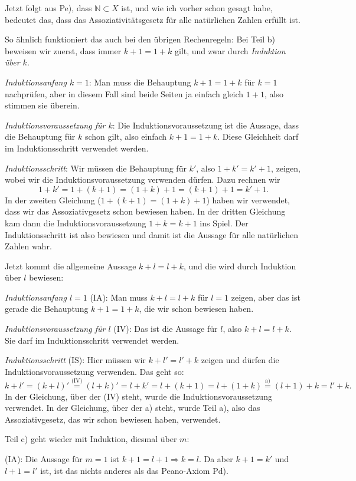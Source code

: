 \documentclass{zusammenfassung}
\begin{document}
Jetzt folgt aus Pe), dass $\mathbb N\subset X$ ist, und wie ich vorher schon gesagt habe, bedeutet das, dass das
Assoziativitätsgesetz für alle natürlichen Zahlen erfüllt ist.

So ähnlich funktioniert das auch bei den übrigen Rechenregeln: Bei Teil b) beweisen wir zuerst, dass immer $k+1=1+k$ gilt, und
zwar durch \emph{Induktion über $k$}.

\emph{Induktionsanfang $k=1$}: Man muss die Behauptung $k+1=1+k$ für $k=1$ nachprüfen, aber in diesem Fall sind beide Seiten ja
einfach gleich $1+1$, also stimmen sie überein.

\emph{Induktionsvoraussetzung für $k$}: Die Induktionsvoraussetzung ist die Aussage, dass die Behauptung für $k$ schon gilt, also
einfach $k+1=1+k$. Diese Gleichheit darf im Induktionsschritt verwendet werden.

\emph{Induktionsschritt}: Wir müssen die Behauptung für $k'$, also $1+k'=k'+1$, zeigen, wobei wir die Induktionsvoraussetzung
verwenden dürfen. Dazu rechnen wir
\[
	1+k'=1+(k+1)=(1+k)+1=(k+1)+1=k'+1.
\]
In der zweiten Gleichung ($1+(k+1)=(1+k)+1$) haben wir verwendet, dass wir das Assoziativgesetz schon bewiesen haben. In der
dritten Gleichung kam dann die Induktionsvoraussetzung $1+k=k+1$ ins Spiel. Der Induktionsschritt ist also bewiesen und damit ist
die Aussage für alle natürlichen Zahlen wahr.

Jetzt kommt die allgemeine Aussage $k+l=l+k$, und die wird durch Induktion über $l$ bewiesen:

\emph{Induktionsanfang $l=1$} (IA): Man muss $k+l=l+k$ für $l=1$ zeigen, aber das ist gerade die Behauptung $k+1=1+k$, die wir
schon bewiesen haben.

\emph{Induktionsvoraussetzung für $l$} (IV): Das ist die Aussage für $l$, also $k+l=l+k$. Sie darf im Induktionsschritt verwendet
werden.

\emph{Induktionsschritt} (IS): Hier müssen wir $k+l'=l'+k$ zeigen und dürfen die Induktionsvoraussetzung verwenden. Das geht so:
\[
	k+l'=(k+l)'\overset{\text{(IV)}}{=}(l+k)'=l+k'=l+(k+1)=l+(1+k)\overset{\text{a)}}{=}(l+1)+k=l'+k.
\]
In der Gleichung, über der (IV) steht, wurde die Induktionsvoraussetzung verwendet. In der Gleichung, über der a) steht, wurde
Teil a), also das Assoziativgesetz, das wir schon bewiesen haben, verwendet.

Teil c) geht wieder mit Induktion, diesmal über $m$:

(IA): Die Aussage für $m=1$ ist $k+1=l+1\Rightarrow k=l$. Da aber $k+1=k'$ und $l+1=l'$ ist, ist das nichts anderes als das
Peano-Axiom Pd).
\end{document}
